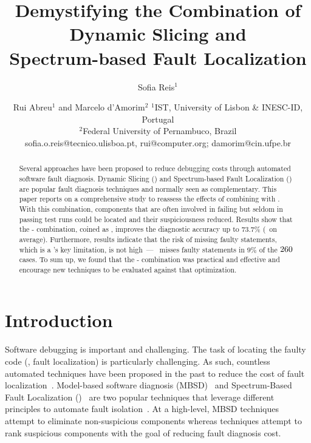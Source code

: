\documentclass{article}
\title{Demystifying the Combination of Dynamic Slicing and \\ Spectrum-based Fault
Localization}
\author{
Sofia Reis$^1$
\and
Rui Abreu$^1$ \textnormal{and}
Marcelo d'Amorim$^2$\affiliations
$^1$IST, University of Lisbon \& INESC-ID, Portugal\\
$^2$Federal University of Pernambuco, Brazil\\
\emails
sofia.o.reis@tecnico.ulisboa.pt,
rui@computer.org; damorim@cin.ufpe.br\\
}
\begin{document}
\maketitle

\begin{abstract}
Several approaches have been proposed to reduce debugging costs through
automated software fault diagnosis.  Dynamic Slicing (\ds{}) and Spectrum-based
Fault Localization (\sfl{}) are popular fault diagnosis techniques and normally
seen as complementary. This paper reports on a comprehensive
study to reassess the effects of combining \ds{} with \sfl{}.  With this
combination, components that are often involved in failing but seldom in passing
test runs could be located and their suspiciousness reduced. Results show that
the \ds{}-\sfl{} combination, coined as \comb, improves the diagnostic
accuracy up to $73.7\%$ (\avgImprov\ on average). Furthermore, results indicate
that the risk of missing faulty statements, which is a \ds{}'s key limitation,
is not high~---~\ds{} misses faulty statements in $9\%$
of the $\numFaults{}$ cases. To sum up, we found that the \ds{}-\sfl{} combination
was practical and effective and encourage new \sfl{} techniques to be evaluated
against that optimization.
\end{abstract}

\section{Introduction}

Software debugging is important and challenging. The task of locating
the faulty code (\ie{}, fault localization) is particularly
challenging. As such, countless automated techniques have been
proposed in the past to reduce the cost of fault
localization~\cite{7390282}. Model-based software diagnosis
(MBSD)~\cite{REITER198757,DEKLEER200325} and Spectrum-Based Fault
Localization (\sfl{})~\cite{DBLP:journals/stvr/HarroldRSWY00} are two
popular techniques that leverage different principles to automate
fault isolation~\cite{DBLP:conf/sac/AbreuGZG08}.  At a high-level,
MBSD
techniques~\cite{wotawa2002model,Mayer:2008:EMM:1642931.1642950,mayer2008prioritising,Perez:2018:LQR:3304889.3304927,Ko:2008:DRA:1368088.1368130}
attempt to eliminate non-suspicious components whereas \sfl{}
techniques attempt to rank suspicious components with the goal of
reducing fault diagnosis cost.
\end{document}
